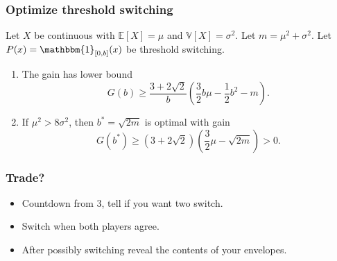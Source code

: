 \documentclass{beamer}
\theoremstyle{plain}
\theoremstyle{definition}
\theoremstyle{remark}
\newcommand{\E}{\mathbb{E}}
\newcommand{\V}{\mathbb{V}}
\newcommand{\1}{\mathbbm{1}}
\begin{document}
\begin{frame}
\frametitle{Optimize threshold switching}

\begin{theorem}
Let $X$ be continuous with $\E[X]=\mu$ and $\V[X]=\sigma^2$. Let $m=\mu^2+\sigma^2$. Let $P(x)=\1_{[0,b]}(x)$ be threshold switching.
\begin{enumerate}
	\item The gain has lower bound
	\[G(b)\geq\frac{3+2\sqrt{2}}{b}\left(\frac{3}{2}b\mu-\frac{1}{2}b^2-m\right).\]
	\item If $\mu^2> 8\sigma^2$, then $b^*=\sqrt{2m}$ is optimal with gain 
	\[G(b^*)\geq(3+2\sqrt{2})\left(\frac{3}{2}\mu-\sqrt{2m}\right)>0.\]
\end{enumerate}
\end{theorem}
\end{frame}
\begin{frame}
\frametitle{Trade?}

\begin{itemize}
\item Countdown from 3, tell if you want two switch.
\item Switch when both players agree.
\item After possibly switching reveal the contents of your envelopes.
\end{itemize}
\end{frame}
\end{document}
